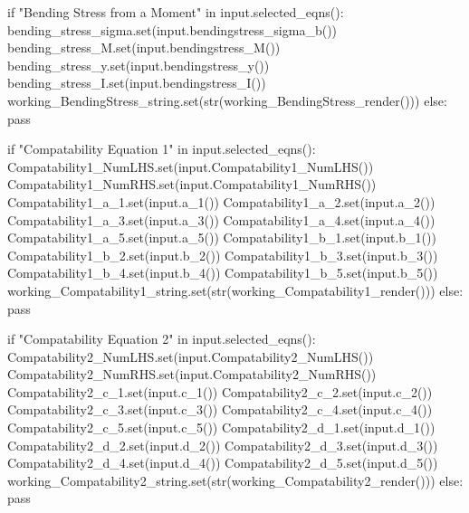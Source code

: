 \documentclass[
  letterpaper,
  DIV=11,
  numbers=noendperiod]{scrreprt}
\newenvironment{Shaded}{\begin{snugshade}}{\end{snugshade}}
\newcommand{\NormalTok}[1]{\textcolor[rgb]{0.00,0.23,0.31}{#1}}
\begin{document}
\begin{Shaded}
\begin{Highlighting}[]
\NormalTok{            if "Bending Stress from a Moment" in input.selected\_eqns(): }
\NormalTok{                bending\_stress\_sigma.set(input.bendingstress\_sigma\_b())}
\NormalTok{                bending\_stress\_M.set(input.bendingstress\_M())}
\NormalTok{                bending\_stress\_y.set(input.bendingstress\_y())}
\NormalTok{                bending\_stress\_I.set(input.bendingstress\_I())}
\NormalTok{                working\_BendingStress\_string.set(str(working\_BendingStress\_render()))}
\NormalTok{            else:}
\NormalTok{                 pass}
    
\NormalTok{            if "Compatability Equation 1" in input.selected\_eqns(): }
\NormalTok{                Compatability1\_NumLHS.set(input.Compatability1\_NumLHS())}
\NormalTok{                Compatability1\_NumRHS.set(input.Compatability1\_NumRHS())}
\NormalTok{                Compatability1\_a\_1.set(input.a\_1())}
\NormalTok{                Compatability1\_a\_2.set(input.a\_2())}
\NormalTok{                Compatability1\_a\_3.set(input.a\_3())}
\NormalTok{                Compatability1\_a\_4.set(input.a\_4())}
\NormalTok{                Compatability1\_a\_5.set(input.a\_5())}
\NormalTok{                Compatability1\_b\_1.set(input.b\_1())}
\NormalTok{                Compatability1\_b\_2.set(input.b\_2())}
\NormalTok{                Compatability1\_b\_3.set(input.b\_3())}
\NormalTok{                Compatability1\_b\_4.set(input.b\_4())}
\NormalTok{                Compatability1\_b\_5.set(input.b\_5())}
\NormalTok{                working\_Compatability1\_string.set(str(working\_Compatability1\_render()))}
\NormalTok{            else:}
\NormalTok{                 pass}
    
\NormalTok{            if "Compatability Equation 2" in input.selected\_eqns(): }
\NormalTok{                Compatability2\_NumLHS.set(input.Compatability2\_NumLHS())}
\NormalTok{                Compatability2\_NumRHS.set(input.Compatability2\_NumRHS())}
\NormalTok{                Compatability2\_c\_1.set(input.c\_1())}
\NormalTok{                Compatability2\_c\_2.set(input.c\_2())}
\NormalTok{                Compatability2\_c\_3.set(input.c\_3())}
\NormalTok{                Compatability2\_c\_4.set(input.c\_4())}
\NormalTok{                Compatability2\_c\_5.set(input.c\_5())}
\NormalTok{                Compatability2\_d\_1.set(input.d\_1())}
\NormalTok{                Compatability2\_d\_2.set(input.d\_2())}
\NormalTok{                Compatability2\_d\_3.set(input.d\_3())}
\NormalTok{                Compatability2\_d\_4.set(input.d\_4())}
\NormalTok{                Compatability2\_d\_5.set(input.d\_5())}
\NormalTok{                working\_Compatability2\_string.set(str(working\_Compatability2\_render()))}
\NormalTok{            else:}
\NormalTok{                 pass}


\end{Highlighting}
\end{Shaded}
\end{document}
